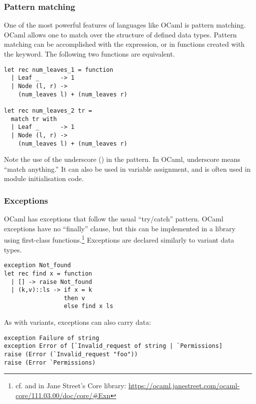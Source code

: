 \subsubsection{Pattern matching}

One of the most powerful features of languages like OCaml is pattern
matching. OCaml allows one to match over the structure of defined data
types. Pattern matching can be accomplished with the
expression, or in functions created with the 
keyword. The following two functions are equivalent.

\begin{lstlisting}
let rec num_leaves_1 = function
  | Leaf _      -> 1
  | Node (l, r) ->
    (num_leaves l) + (num_leaves r)

let rec num_leaves_2 tr =
  match tr with
  | Leaf _      -> 1
  | Node (l, r) ->
    (num_leaves l) + (num_leaves r)
\end{lstlisting}

Note the use of the underscore (\code{_}) in the 
pattern. In OCaml, underscore means ``match anything.'' It can also be
used in variable assignment, and is often used in module
initialisation code.

\subsubsection{Exceptions}

OCaml has exceptions that follow the usual ``try/catch''
pattern. OCaml exceptions have no ``finally'' clause, but this can be
implemented in a library using first-class
functions.\footnote{cf.  and  in Jane
  Street's Core library:
  \url{https://ocaml.janestreet.com/ocaml-core/111.03.00/doc/core/\#Exn}}
Exceptions are declared similarly to variant data types.

\begin{lstlisting}
exception Not_found
let rec find x = function
  | [] -> raise Not_found
  | (k,v)::ls -> if x = k
                 then v
                 else find x ls
\end{lstlisting}

As with variants, exceptions can also carry data:

\begin{lstlisting}
exception Failure of string
exception Error of [`Invalid_request of string | `Permissions]
raise (Error (`Invalid_request "foo"))
raise (Error `Permissions)
\end{lstlisting}

